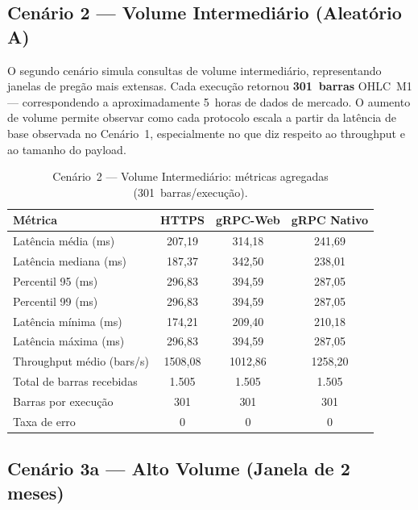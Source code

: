 \subsection{Cenário 2 — Volume Intermediário (Aleatório A)}
\label{sec:cenario2}

O segundo cenário simula consultas de volume intermediário, representando
janelas de pregão mais extensas. Cada execução retornou \textbf{301~barras}
OHLC~M1 — correspondendo a aproximadamente 5~horas de dados de mercado. O
aumento de volume permite observar como cada protocolo escala a partir da
latência de base observada no Cenário~1, especialmente no que diz respeito ao
throughput e ao tamanho do payload.

\begin{table}[H]
  \centering
  \caption{Cenário~2 — Volume Intermediário: métricas agregadas
    (301~barras/execução).}
  \label{tab:cenario2-summary}
  \begin{tabular}{l S[table-format=4.2] S[table-format=4.2] S[table-format=4.2]}
    \toprule
    \textbf{Métrica} & {\textbf{HTTPS}} & {\textbf{gRPC-Web}} & {\textbf{gRPC Nativo}} \\
    \midrule
    Latência média (ms)        & 207,19  & 314,18  & 241,69  \\
    Latência mediana (ms)      & 187,37  & 342,50  & 238,01  \\
    Percentil 95 (ms)          & 296,83  & 394,59  & 287,05  \\
    Percentil 99 (ms)          & 296,83  & 394,59  & 287,05  \\
    Latência mínima (ms)       & 174,21  & 209,40  & 210,18  \\
    Latência máxima (ms)       & 296,83  & 394,59  & 287,05  \\
    Throughput médio (bars/s)  & 1508,08 & 1012,86 & 1258,20 \\
    Total de barras recebidas  & {1.505}    & {1.505}    & {1.505}    \\
    Barras por execução        & {301}     & {301}     & {301}     \\
    Taxa de erro               & {0}       & {0}       & {0}       \\
    \bottomrule
  \end{tabular}
\end{table}

\subsection{Cenário 3a — Alto Volume (Janela de 2 meses)}
\label{sec:cenario3a}


